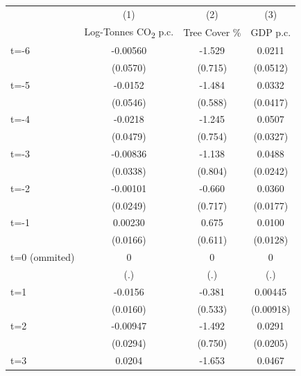 \begin{tabular}{l*{3}{c}}
\hline
            &\multicolumn{1}{c}{(1)}&\multicolumn{1}{c}{(2)}&\multicolumn{1}{c}{(3)}\\
            &\multicolumn{1}{c}{Log-Tonnes CO\textsubscript{2} p.c.}&\multicolumn{1}{c}{Tree Cover \%}&\multicolumn{1}{c}{GDP p.c.}\\
\hline
t=-6        &    -0.00560         &      -1.529\sym{**} &      0.0211         \\
            &    (0.0570)         &     (0.715)         &    (0.0512)         \\
t=-5        &     -0.0152         &      -1.484\sym{**} &      0.0332         \\
            &    (0.0546)         &     (0.588)         &    (0.0417)         \\
t=-4        &     -0.0218         &      -1.245\sym{*}  &      0.0507         \\
            &    (0.0479)         &     (0.754)         &    (0.0327)         \\
t=-3        &    -0.00836         &      -1.138         &      0.0488\sym{**} \\
            &    (0.0338)         &     (0.804)         &    (0.0242)         \\
t=-2        &    -0.00101         &      -0.660         &      0.0360\sym{**} \\
            &    (0.0249)         &     (0.717)         &    (0.0177)         \\
t=-1        &     0.00230         &       0.675         &      0.0100         \\
            &    (0.0166)         &     (0.611)         &    (0.0128)         \\
t=0 (ommited)&           0         &           0         &           0         \\
            &         (.)         &         (.)         &         (.)         \\
t=1         &     -0.0156         &      -0.381         &     0.00445         \\
            &    (0.0160)         &     (0.533)         &   (0.00918)         \\
t=2         &    -0.00947         &      -1.492\sym{**} &      0.0291         \\
            &    (0.0294)         &     (0.750)         &    (0.0205)         \\
t=3         &      0.0204         &      -1.653\sym{*}  &      0.0467         \\

\end{tabular}
